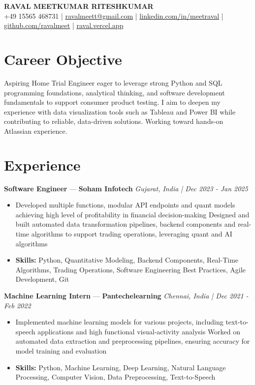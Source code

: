 \documentclass[a4paper,10pt]{article}
\begin{document}
\begin{center}
  {\Large\bfseries RAVAL MEETKUMAR RITESHKUMAR}\\[2pt]
  {\small +49 15565 468731 \;|\; \href{mailto:ravalmeett@gmail.com}{ravalmeett@gmail.com} \;|\; \href{https://www.linkedin.com/in/meetraval/}{linkedin.com/in/meetraval} \;|\; \href{https://github.com/ravalmeet}{github.com/ravalmeet} \;|\; \href{https://raval.vercel.app/}{raval.vercel.app}}
\end{center}
\vspace{-3pt}

\section*{Career Objective}
Aspiring Home Trial Engineer eager to leverage strong Python and SQL programming foundations, analytical thinking, and software development fundamentals to support consumer product testing. I aim to deepen my experience with data visualization tools such as Tableau and Power BI while contributing to reliable, data-driven solutions. Working toward hands-on Atlassian experience.\par

\section*{Experience}
\textbf{Software Engineer} — \textbf{Soham Infotech} \hfill \textit{Gujarat, India \;|\; Dec 2023 - Jan 2025}\par
\vspace{1pt}
\begin{itemize}
  \item Developed multiple functions, modular API endpoints and quant models achieving high level of profitability in financial decision-making Designed and built automated data transformation pipelines, backend components and real-time algorithms to support trading operations, leveraging quant and AI algorithms
  \item \textbf{Skills:} Python, Quantitative Modeling, Backend Components, Real-Time Algorithms, Trading Operations, Software Engineering Best Practices, Agile Development, Git
\end{itemize}
\vspace{3pt}
\textbf{Machine Learning Intern} — \textbf{Pantechelearning} \hfill \textit{Chennai, India \;|\; Dec 2021 - Feb 2022}\par
\vspace{1pt}
\begin{itemize}
  \item Implemented machine learning models for various projects, including text-to-speech applications and high functional visual-activity analysis Worked on automated data extraction and preprocessing pipelines, ensuring accuracy for model training and evaluation
  \item \textbf{Skills:} Python, Machine Learning, Deep Learning, Natural Language Processing, Computer Vision, Data Preprocessing, Text-to-Speech
\end{itemize}
\end{document}
